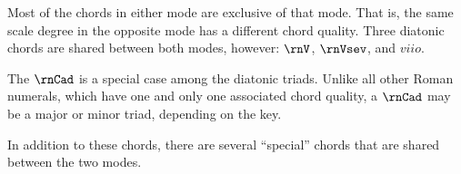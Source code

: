 
Most of the chords in either mode are exclusive of that
mode. That is, the same scale degree in the opposite mode
has a different chord quality. Three diatonic chords are
shared between both modes, however: $\rnV$, $\rnVsev$, and
$viio$. 

The $\rnCad$ is a special case among the diatonic triads.
Unlike all other Roman numerals, which have one and only one
associated chord quality, a $\rnCad$ may be a major or minor
triad, depending on the key.

In addition to these chords, there are several ``special''
chords that are shared between the two modes.

